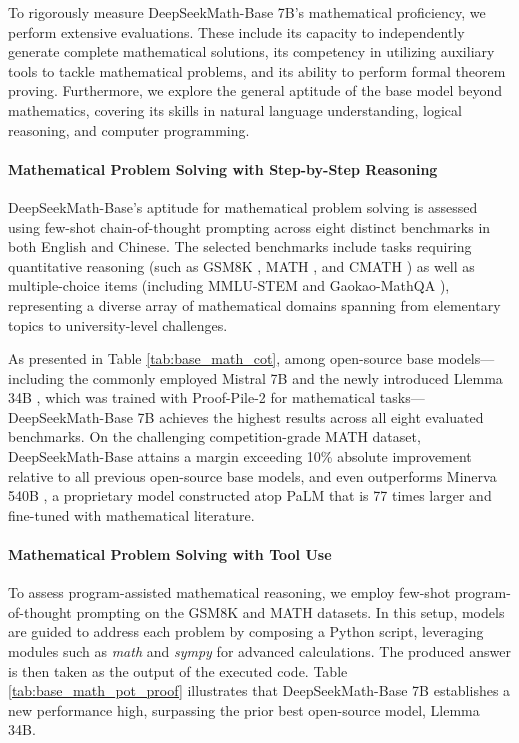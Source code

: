 To rigorously measure DeepSeekMath-Base 7B’s mathematical proficiency, we perform extensive evaluations. These include its capacity to independently generate complete mathematical solutions, its competency in utilizing auxiliary tools to tackle mathematical problems, and its ability to perform formal theorem proving. Furthermore, we explore the general aptitude of the base model beyond mathematics, covering its skills in natural language understanding, logical reasoning, and computer programming.

\paragraph{Mathematical Problem Solving with Step-by-Step Reasoning}

DeepSeekMath-Base’s aptitude for mathematical problem solving is assessed using few-shot chain-of-thought prompting \citep{cot} across eight distinct benchmarks in both English and Chinese. The selected benchmarks include tasks requiring quantitative reasoning (such as GSM8K \citep{gsm8k}, MATH \citep{MATH}, and CMATH \citep{wei2023cmath}) as well as multiple-choice items (including MMLU-STEM \citep{mmlu} and Gaokao-MathQA \citep{agieval}), representing a diverse array of mathematical domains spanning from elementary topics to university-level challenges.

As presented in Table \ref{tab:base_math_cot}, among open-source base models—including the commonly employed Mistral 7B \citep{mistral} and the newly introduced Llemma 34B \citep{llemma}, which was trained with Proof-Pile-2 \citep{llemma} for mathematical tasks—DeepSeekMath-Base 7B achieves the highest results across all eight evaluated benchmarks. On the challenging competition-grade MATH dataset, DeepSeekMath-Base attains a margin exceeding 10\% absolute improvement relative to all previous open-source base models, and even outperforms Minerva 540B \citep{minerva}, a proprietary model constructed atop PaLM \citep{palm} that is 77 times larger and fine-tuned with mathematical literature.

\paragraph{Mathematical Problem Solving with Tool Use} To assess program-assisted mathematical reasoning, we employ few-shot program-of-thought prompting \citep{pot,pal} on the GSM8K and MATH datasets. In this setup, models are guided to address each problem by composing a Python script, leveraging modules such as \textit{math} and \textit{sympy} for advanced calculations. The produced answer is then taken as the output of the executed code. Table \ref{tab:base_math_pot_proof} illustrates that DeepSeekMath-Base 7B establishes a new performance high, surpassing the prior best open-source model, Llemma 34B.

